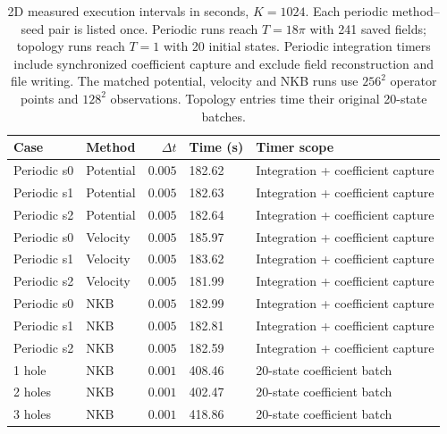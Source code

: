 \begin{table}[!htb]\centering\footnotesize\setlength{\tabcolsep}{4pt}
\caption{2D measured execution intervals in seconds, $K=1024$. Each periodic method--seed pair is listed once. Periodic runs reach $T=18\pi$ with 241 saved fields; topology runs reach $T=1$ with 20 initial states. Periodic integration timers include synchronized coefficient capture and exclude field reconstruction and file writing. The matched potential, velocity and NKB runs use $256^2$ operator points and $128^2$ observations. Topology entries time their original 20-state batches.}
\label{tab:runtime-2d-online}

\begin{tabular}{llrll}\toprule
Case&Method&$\Delta t$&Time (s)&Timer scope\\\midrule
Periodic s0 & Potential & $0.005$ & 182.62 & Integration + coefficient capture\\
Periodic s1 & Potential & $0.005$ & 182.63 & Integration + coefficient capture\\
Periodic s2 & Potential & $0.005$ & 182.64 & Integration + coefficient capture\\
Periodic s0 & Velocity & $0.005$ & 185.97 & Integration + coefficient capture\\
Periodic s1 & Velocity & $0.005$ & 183.62 & Integration + coefficient capture\\
Periodic s2 & Velocity & $0.005$ & 181.99 & Integration + coefficient capture\\
Periodic s0 & NKB & $0.005$ & 182.99 & Integration + coefficient capture\\
Periodic s1 & NKB & $0.005$ & 182.81 & Integration + coefficient capture\\
Periodic s2 & NKB & $0.005$ & 182.59 & Integration + coefficient capture\\
1 hole & NKB & $0.001$ & 408.46 & 20-state coefficient batch\\
2 holes & NKB & $0.001$ & 402.47 & 20-state coefficient batch\\
3 holes & NKB & $0.001$ & 418.86 & 20-state coefficient batch\\
\bottomrule\end{tabular}\end{table}
